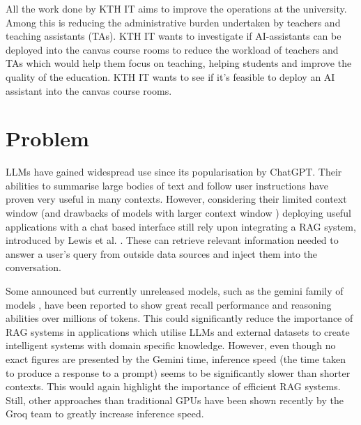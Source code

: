 All the work done by KTH IT aims to improve the operations at the university. Among this is reducing the administrative burden undertaken by teachers and teaching assistants (TAs). KTH IT wants to investigate if AI-assistants can be deployed into the canvas course rooms to reduce the workload of teachers and TAs which would help them focus on teaching, helping students and improve the quality of the education. KTH IT wants to see if it’s feasible to deploy an AI assistant into the canvas course rooms.


\section{Problem}
\label{sec:problem}




\gls{LLM}s have gained widespread use since its popularisation by ChatGPT. Their abilities to summarise large bodies of text and follow user instructions have proven very useful in many contexts. However, considering their limited context window (and drawbacks of models with larger context window \cite{liu_lost_2023}) deploying useful applications with a chat based interface still rely upon integrating a RAG system, introduced by Lewis et al. \cite{lewis_retrieval-augmented_2021}. These can retrieve relevant information needed to answer a user's query from outside data sources and inject them into the conversation.


Some announced but currently unreleased models, such as the gemini family of models \cite{gemini_team_gemini_2023}, have been reported to show great recall performance and reasoning abilities over millions of tokens. This could significantly reduce the importance of RAG systems in applications which utilise \gls{LLM}s and external datasets to create intelligent systems with domain specific knowledge. However, even though no exact figures are presented by the Gemini time, inference speed (the time taken to produce a response to a prompt) seems to be significantly slower than shorter contexts. This would again highlight the importance of efficient RAG systems. Still, other approaches than traditional GPUs have been shown recently \cite{abts_software-defined_2022} by the Groq team to greatly increase inference speed.



